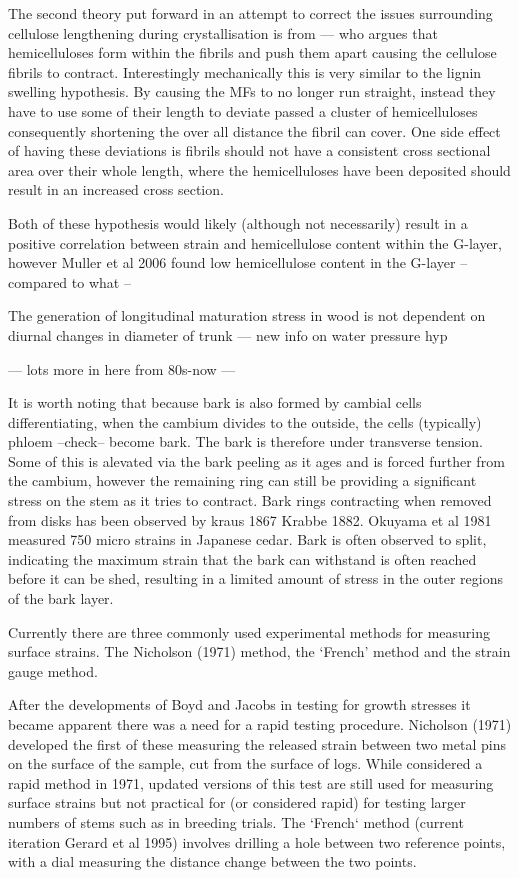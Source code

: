 \documentclass{article}
\begin{document}
The second theory put forward in an attempt to correct the issues surrounding
cellulose lengthening during crystallisation is from --- who argues that
hemicelluloses form within the fibrils and push them apart causing the
cellulose fibrils to contract. Interestingly mechanically this is very similar
to the lignin swelling hypothesis. By causing the MFs to no longer run straight,
instead they have to use some of their length to deviate passed a cluster of
hemicelluloses consequently shortening the over all distance the fibril can
cover. One side effect of having these deviations is fibrils should not have a
consistent cross sectional area over their whole length, where the
hemicelluloses have been deposited should result in an increased cross section.

Both of these hypothesis would likely (although not necessarily) result in a
positive correlation between strain and hemicellulose content within the
G-layer, however Muller et al 2006 found low hemicellulose content in the
G-layer --compared to what --

The generation of longitudinal maturation stress in wood is not dependent on
diurnal changes in diameter of trunk --- new info on water pressure hyp

--- lots more in here from 80s-now ---

It is worth noting that because bark is also formed by cambial cells
differentiating, when the cambium divides to the outside, the cells (typically)
phloem --check-- become bark. The bark is therefore under transverse tension.
Some of this is alevated via the bark peeling as it ages and is forced further
from the cambium, however the remaining ring can still be providing a
significant stress on the stem as it tries to contract. Bark rings contracting
when removed from disks has been observed by kraus 1867 Krabbe 1882. Okuyama et
al 1981 measured 750 micro strains in Japanese cedar. Bark is often observed to
split, indicating the maximum strain that the bark can withstand is often
reached before it can be shed, resulting in a limited amount of stress in the
outer regions of the bark layer.

Currently there are three commonly used experimental methods for measuring
surface strains. The Nicholson (1971) method, the `French' method and the strain
gauge method.

After the developments of Boyd and Jacobs in testing for growth stresses it
became apparent there was a need for a rapid testing procedure. Nicholson (1971)
developed the first of these measuring the released strain between two metal pins
on the surface of the sample, cut from the surface of logs. While considered a
rapid method in 1971, updated versions of this test are still used for measuring
surface strains but not practical for (or considered rapid) for testing larger
numbers of stems such as in breeding trials. The `French` method (current
iteration Gerard et al 1995) involves drilling a hole between two reference
points, with a dial measuring the distance change between the two points.
\end{document}
